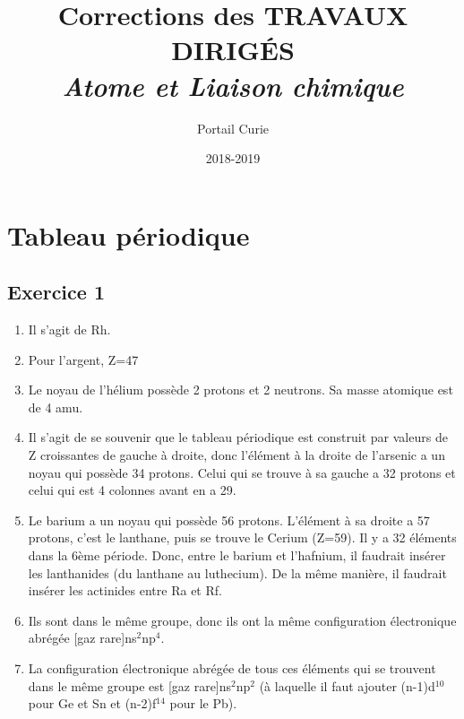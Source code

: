 \documentclass[12pt,french,dvips]{report}
\title{{\Huge Corrections des TRAVAUX DIRIG\'ES  \\[1.5cm] 
\textsl{Atome et Liaison chimique}}}
\author{Portail Curie}
\date{2018-2019}
\begin{document}
\pagestyle{empty}
\maketitle

\section{Tableau périodique}
\subsection{Exercice 1}
\begin{enumerate}
\item Il s'agit de Rh.
\item Pour l'argent, Z=47
\item Le noyau de l'hélium possède 2 protons et 2 neutrons. Sa masse atomique est de 4 amu.
\item Il s'agit de se souvenir que le tableau périodique est construit par valeurs de Z croissantes
de gauche à droite, donc l'élément à la droite de l'arsenic a un noyau qui possède 34 protons. Celui
qui se trouve à sa gauche a 32 protons et celui qui est 4 colonnes avant en a 29.
\item Le barium a un noyau qui possède 56 protons. L'élément à sa droite a 57 protons, c'est le lanthane,
puis se trouve le Cerium (Z=59). Il y a 32 éléments dans la 6ème période.
Donc, entre le barium et l'hafnium, il faudrait insérer
les lanthanides (du lanthane au luthecium).
De la même manière, il faudrait insérer les actinides entre Ra et Rf.
\item Ils sont dans le même groupe, donc ils ont la même configuration électronique
abrégée [gaz rare]ns$^2$np$^4$.
\item La configuration électronique abrégée de tous ces éléments qui se trouvent dans le
même groupe est [gaz rare]ns$^2$np$^2$ (à laquelle il faut ajouter (n-1)d$^{10}$ pour Ge et Sn
et (n-2)f$^{14}$ pour le Pb).
\end{enumerate}
\end{document}
